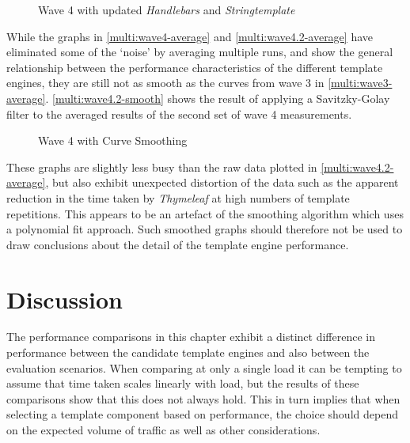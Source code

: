 \begin{figure}[ht!]
\centering

\caption{\label{multi:wave4.2-average}Wave 4 with updated \emph{Handlebars} and \emph{Stringtemplate}}
\end{figure}

While the graphs in \autoref{multi:wave4-average} and \autoref{multi:wave4.2-average} have eliminated some of the `noise' by averaging multiple runs, and show the general relationship between the performance characteristics of the different template engines, they are still not as smooth as the curves from wave 3 in \autoref{multi:wave3-average}. \autoref{multi:wave4.2-smooth} shows the result of applying a Savitzky-Golay filter \citep{Schafer2011} to the averaged results of the second set of wave 4 measurements.

\begin{figure}[ht!]
\centering

\caption{\label{multi:wave4.2-smooth}Wave 4 with Curve Smoothing}
\end{figure}

These graphs are slightly less busy than the raw data plotted in \autoref{multi:wave4.2-average}, but also exhibit unexpected distortion of the data such as the apparent reduction in the time taken by \emph{Thymeleaf} at high numbers of template repetitions. This appears to be an artefact of the smoothing algorithm which uses a polynomial fit approach. Such smoothed graphs should therefore not be used to draw conclusions about the detail of the template engine performance.

\section{Discussion}
\label{comp:fs2:dicsussion}

The performance comparisons in this chapter exhibit a distinct difference in performance between the candidate template engines and also between the evaluation scenarios. When comparing at only a single load it can be tempting to assume that time taken scales linearly with load, but the results of these comparisons show that this does not always hold. This in turn implies that when selecting a template component based on performance, the choice should depend on the expected volume of traffic as well as other considerations.

